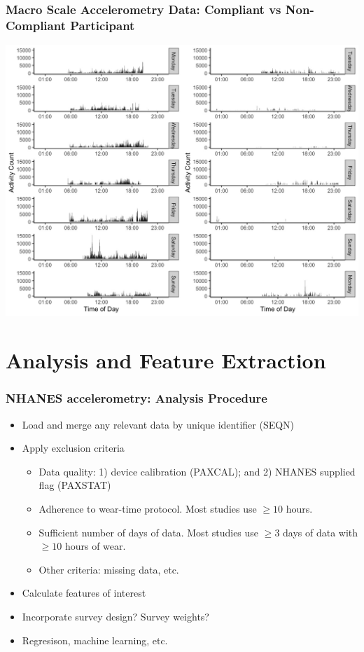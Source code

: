 \documentclass[10pt]{beamer}\usepackage[]{graphicx}\usepackage[]{color}
\begin{document}
\begin{frame}
\frametitle{Macro Scale Accelerometry Data: Compliant vs Non-Compliant Participant}
\centering
\includegraphics[height=\textheight]{profile_id1_id2}
\end{frame}





\section{Analysis and Feature Extraction}






\begin{frame}
\frametitle{NHANES accelerometry: Analysis Procedure}
\begin{itemize}
\item Load and merge any relevant data by unique identifier (SEQN)
\item Apply exclusion criteria
    \begin{itemize}
    \item Data quality: 1) device calibration (PAXCAL); and 2) NHANES supplied flag (PAXSTAT)
    \item Adherence to wear-time protocol. Most studies use $\geq 10$ hours.
    \item Sufficient number of days of data. Most studies use $ \geq 3$ days of data with $\geq 10$ hours of wear.
    \item Other criteria: missing data, etc.
    \end{itemize}
\item Calculate features of interest
\item Incorporate survey design? Survey weights?
\item Regresison, machine learning, etc.
\end{itemize}
\end{frame}
\end{document}
